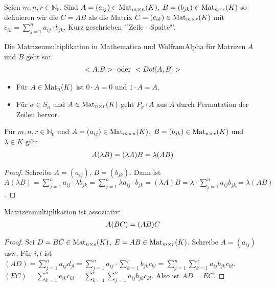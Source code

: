 \begin{definition}[Matrizenmultiplikation]
	Seien $m,n,r \in \mathbb N_0$. Sind $A=(a_{ij})\in \Mat_{m\times n}(K)$, 
	$B=(b_{jk})\in \Mat_{n\times r}(K)$ so definieren wir die  $C=AB$ als die Matrix $C=(c_{ik})\in \Mat_{m\times r}(K)$ mit 
	$c_{ik}=\sum_{j=1}^n a_{ij}\cdot b_{jk}$. Kurz geschrieben "'Zeile $\cdot$ Spalte"'.
\end{definition}

\begin{mathematica}[Matrizenmultiplikation]
	Die Matrizenmultiplikation in Mathematica und WolframAlpha für Matrizen $A$ und $B$ geht so:
	\begin{align}
		\texttt{A.B}\text{ oder }\texttt{Dot[A,B]}\notag
	\end{align}
\end{mathematica}

\begin{example}
	\begin{itemize}
		\item Für $A\in \Mat_n(K)$ ist $0\cdot A=0$ und $1\cdot A=A$.
		\item Für $\sigma \in S_n$ und $A\in \Mat_{n\times r}(K)$ geht $P_{\sigma}\cdot A$ aus $A$ durch Permutation der 
		Zeilen hervor.
	\end{itemize}
\end{example}

\begin{lemma}
	Für $m,n,r \in \mathbb N_0$ und $A=(a_{ij})\in \Mat_{m\times n}(K)$, $B=(b_{jk})\in \Mat_
	{n\times r}(K)$ und $\lambda\in K$ gilt:
	\begin{align}
		A(\lambda B)=(\lambda A)B=\lambda(AB)\notag
	\end{align}
\end{lemma}
\begin{proof}
	Schreibe $A=(a_{ij})$, $B=(b_{jk})$. Dann ist $A(\lambda B)=\sum_{j=1}^n a_{ij}\cdot \lambda b_{jk}=\sum
	_{j=1}^n \lambda a_{ij} \cdot b_{jk}=(\lambda A)B=\lambda \cdot \sum_{j=1}^n a_{ij}b_{jk}=\lambda
	(AB)$.
\end{proof}

\begin{lemma}
	Matrizenmultiplikation ist assoziativ:
	\begin{align}
		A(BC)=(AB)C\notag
	\end{align}
\end{lemma}
\begin{proof}
	Sei $D=BC\in \Mat_{n\times s}(K)$, $E=AB \in \Mat_{m\times r}(K)$. Schreibe $A=(a_{ij})$ usw. Für $i,l$ ist $(AD)=
	\sum_{j=1}^n a_{ij}d_{jl}=\sum_{j=1}^n a_{ij}\cdot \sum_{k=1}^r b_{jk}c_{kl}=\sum
	_{j=1}^n \sum_{k=1}^n a_{ij}b_{jk}c_{kl}$. \\
	$(EC)=\sum_{k=1}^n e_{ik}c_{kl}=\sum_{k=1}^r \sum_{j=1}^n a_{ij}b_{jk}c_{kl}$. Also ist 
	$AD=EC$.
\end{proof}

